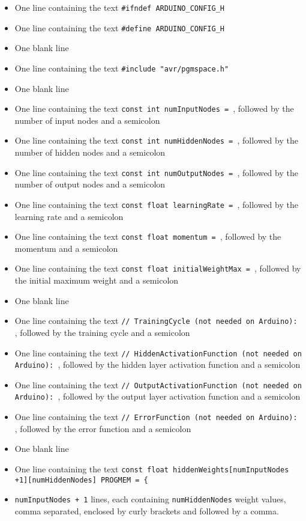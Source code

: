 \documentclass[a4paper]{article}
\begin{document}
\small
\begin{itemize}
\item One line containing the text \lstinline{#ifndef ARDUINO_CONFIG_H}
\item One line containing the text \lstinline{#define ARDUINO_CONFIG_H}
\item One blank line
\item One line containing the text \lstinline{#include "avr/pgmspace.h"}
\item One blank line
\item One line containing the text \lstinline{const int numInputNodes = }, followed by the number of input nodes and a semicolon
\item One line containing the text \lstinline{const int numHiddenNodes = }, followed by the number of hidden nodes and a semicolon
\item One line containing the text \lstinline{const int numOutputNodes = }, followed by the number of output nodes and a semicolon
\item One line containing the text \lstinline{const float learningRate = }, followed by the learning rate and a semicolon
\item One line containing the text \lstinline{const float momentum = }, followed by the momentum and a semicolon
\item One line containing the text \lstinline{const float initialWeightMax = }, followed by the initial maximum weight and a semicolon
\item One blank line
\item One line containing the text \lstinline{// TrainingCycle (not needed on Arduino): }, followed by the training cycle and a semicolon
\item One line containing the text \lstinline{// HiddenActivationFunction (not needed on Arduino): }, followed by the hidden layer activation function and a semicolon
\item One line containing the text \lstinline{// OutputActivationFunction (not needed on Arduino): }, followed by the output layer activation function and a semicolon
\item One line containing the text \lstinline{// ErrorFunction (not needed on Arduino): }, followed by the error function and a semicolon
\item One blank line
\item One line containing the text \lstinline|const float hiddenWeights[numInputNodes +1][numHiddenNodes] PROGMEM = {|
\item \lstinline{numInputNodes + 1} lines, each containing \lstinline{numHiddenNodes} weight values, comma separated, enclosed by curly brackets and followed by a comma.

\end{itemize}
\end{document}

